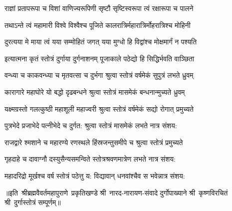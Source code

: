 \twolineshloka
{राज्ञां प्रतापरूपा च विशां वाणिज्यरूपिणी}
{सृष्टौ सृष्टिस्वरूपा त्वं रक्षारूपा च पालने}

\twolineshloka
{तथाऽन्ते त्वं महामारी विश्वे विश्वैश्च पूजिते}
{कालरात्रिर्महारात्रिर्मोहरात्रिश्च मोहिनी}

\twolineshloka
{दुरत्यया मे माया त्वं यया सम्मोहितं जगत्}
{यया मुग्धो हि विद्वांश्च मोक्षमार्गं न पश्यति}


\twolineshloka
{इत्यात्मना कृतं स्तोत्रं दुर्गाया दुर्गनाशनम्}
{पूजाकाले पठेद्यो हि सिद्धिर्भवति वाञ्छिता}

\twolineshloka
{वन्ध्या च काकवन्ध्या च मृतवत्सा च दुर्भगा}
{श्रुत्वा स्तोत्रं वर्षमेकं सुपुत्रं लभते ध्रुवम्}

\twolineshloka
{कारागारे महाघोरे यो बद्धो दृढबन्धने}
{श्रुत्वा स्तोत्रं मासमेकं बन्धनान्मुच्यते ध्रुवम्}

\twolineshloka
{यक्ष्मग्रस्तो गलत्कुष्ठी महाशूली महाज्वरी}
{श्रुत्वा स्तोत्रं वर्षमेकं सद्यो रोगात् प्रमुच्यते}

\twolineshloka
{पुत्रभेदे प्रजाभेदे पत्‍‌नीभेदे च दुर्गत:}
{श्रुत्वा स्तोत्रं मासमेकं लभते नात्र संशय:}

\twolineshloka
{राजद्वारे श्मशाने च महारण्ये रणस्थले}
{हिंस्रजन्तुसमीपे च श्रुत्वा स्तोत्रं प्रमुच्यते}

\twolineshloka
{गृहदाहे च दावाग्नौ दस्युसैन्यसमन्विते}
{स्तोत्रश्रवणमात्रेण लभते नात्र संशय:}

\twolineshloka
{महादरिद्रो मूर्खश्च वर्ष स्तोत्रं पठेत्तु य:}
{विद्यावान् धनवांश्चैव स भवेन्नात्र संशय:}

{॥इति~श्रीब्रह्मवैवर्तमहापुराणे~प्रकृतिखण्डे श्री~नारद-नारायण-संवादे दुर्गोपाख्याने श्री~कृष्णविरचितं श्री~दुर्गास्तोत्रं सम्पूर्णम्॥}